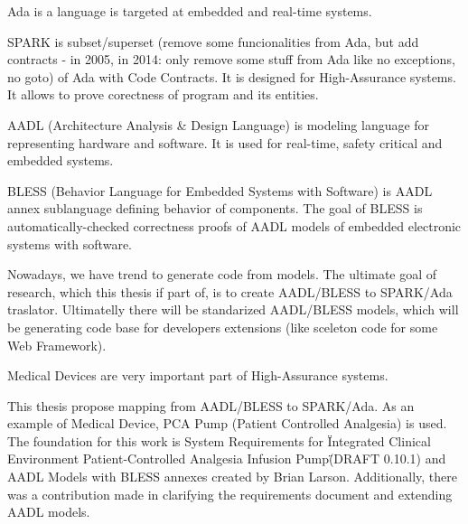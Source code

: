 
\pagestyle{empty}
\setlength{\baselineskip}{0.8cm}



Ada is a language is targeted at embedded and real-time systems.

SPARK is subset/superset (remove some funcionalities from Ada, but add contracts - in 2005, in 2014: only remove some stuff from Ada like no exceptions, no goto) of Ada with Code Contracts. It is designed for High-Assurance systems. It allows to prove corectness of program and its entities.

AADL (Architecture Analysis \& Design Language) is modeling language for representing hardware and software. It is used for real-time, safety critical and embedded systems.

BLESS (Behavior Language for Embedded Systems with Software) is AADL annex sublanguage defining behavior of components. The goal of BLESS is automatically-checked correctness proofs of AADL models of embedded electronic systems with software.

Nowadays, we have trend to generate code from models. The ultimate goal of research, which this thesis if part of, is to create AADL/BLESS to SPARK/Ada traslator. Ultimatelly there will be standarized AADL/BLESS models, which will be generating code base for developers extensions (like sceleton code for some Web Framework).

Medical Devices are very important part of High-Assurance systems.

This thesis propose mapping from AADL/BLESS to SPARK/Ada. As an example of Medical Device, PCA Pump (Patient Controlled Analgesia) is used. The foundation for this work is System Requirements for \"Integrated Clinical Environment Patient-Controlled Analgesia Infusion Pump\" (DRAFT 0.10.1) and AADL Models with BLESS annexes created by Brian Larson. Additionally, there was a contribution made in clarifying the requirements document and extending AADL models.
